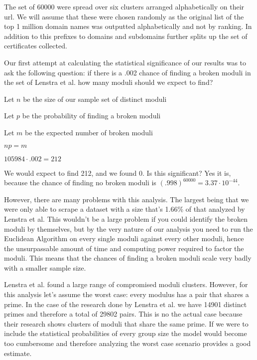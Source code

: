 \documentclass[11pt,twoside]{article}
\begin{document}
\begin{multicols}{2}
The set of 60000 were spread over six clusters arranged alphabetically on their
url. We will assume that these were chosen randomly as the original list of the
top 1 million domain names was outputted alphabetically and not by ranking. In
addition to this prefixes to domains and subdomains further splits up the set of
certificates collected. 

Our first attempt at calculating the statistical significance of our results was
to ask the following question: if there is a .002 chance of finding a broken
moduli in the set of Lenstra et al. how many moduli should we expect to find?

\begin{compactitem}
\item Let $n$ be the size of our sample set of distinct moduli
\item Let $p$ be the probability of finding a broken moduli
\item Let $m$ be the expected number of broken moduli
\item $np = m$
\item $105984 \cdot .002 = 212$
\end{compactitem}


We would expect to find 212, and we found 0. Is this significant? Yes it is,
because the chance of finding no broken moduli is $(.998)^{60 000} = 
3.37\cdot10^{-44}$.

However, there are many problems with this analysis. The largest being that we
were only able to scrape a dataset with a size that's 1.66\% of that analyzed by
Lenstra et al. This wouldn't be a large problem if you could identify the broken
moduli by themselves, but by the very nature of our analysis you need to run the
Euclidean Algorithm on every single moduli against every other moduli, hence the
unsurpassable amount of time and computing power required to factor the moduli.
This means that the chances of finding a broken moduli scale very badly with a
smaller sample size. 

Lenstra et al. found a large range of compromised moduli clusters. However, for
this analysis let's assume the worst case: every modulus has a pair that shares
a prime. In the case of the research done by Lenstra et al. we have 14901
distinct primes and therefore a total of 29802 pairs. This is no the actual case
because their research shows clusters of moduli that share the same prime. If we
were to include the statistical probabilities of every group size the model
would become too cumbersome and therefore analyzing the worst case scenario
provides a good estimate.


\end{multicols}
\end{document}
